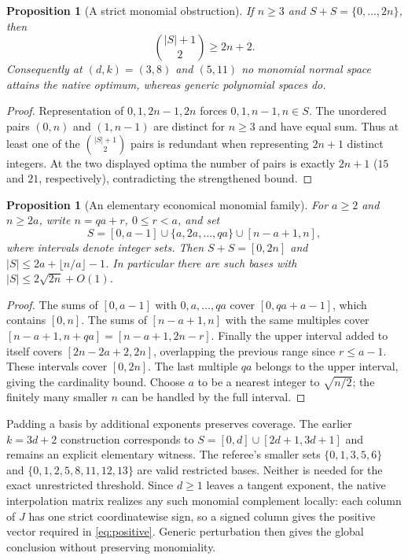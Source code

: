 \documentclass[11pt,reqno]{amsart}
\numberwithin{equation}{section}
\newtheorem{proposition}[theorem]{Proposition}
\theoremstyle{definition}\newtheorem{definition}[theorem]{Definition}
\theoremstyle{remark}\newtheorem{remark}[theorem]{Remark}
\begin{document}
\begin{proposition}[A strict monomial obstruction]\label{prop:monomial}
If $n\ge3$ and $S+S=\{0,\ldots,2n\}$, then
\[
 \binom{|S|+1}{2}\ge 2n+2.
\]
Consequently at $(d,k)=(3,8)$ and $(5,11)$ no monomial normal space attains the native optimum, whereas generic polynomial spaces do.
\end{proposition}
\begin{proof}
Representation of $0,1,2n-1,2n$ forces $0,1,n-1,n\in S$. The unordered pairs $(0,n)$ and $(1,n-1)$ are distinct for $n\ge3$ and have equal sum. Thus at least one of the $\binom{|S|+1}{2}$ pairs is redundant when representing $2n+1$ distinct integers. At the two displayed optima the number of pairs is exactly $2n+1$ ($15$ and $21$, respectively), contradicting the strengthened bound.
\end{proof}

\begin{proposition}[An elementary economical monomial family]\label{prop:basis}
For $a\ge2$ and $n\ge2a$, write $n=qa+r$, $0\le r<a$, and set
\[
 S=[0,a-1]\cup\{a,2a,\ldots,qa\}\cup[n-a+1,n],
\]
where intervals denote integer sets. Then $S+S=[0,2n]$ and
$|S|\le2a+\lfloor n/a\rfloor-1$. In particular there are such bases with $|S|\le2\sqrt{2n}+O(1)$.
\end{proposition}
\begin{proof}
The sums of $[0,a-1]$ with $0,a,\ldots,qa$ cover $[0,qa+a-1]$, which contains $[0,n]$. The sums of $[n-a+1,n]$ with the same multiples cover $[n-a+1,n+qa]=[n-a+1,2n-r]$. Finally the upper interval added to itself covers $[2n-2a+2,2n]$, overlapping the previous range since $r\le a-1$. These intervals cover $[0,2n]$. The last multiple $qa$ belongs to the upper interval, giving the cardinality bound. Choose $a$ to be a nearest integer to $\sqrt{n/2}$; the finitely many smaller $n$ can be handled by the full interval.
\end{proof}
Padding a basis by additional exponents preserves coverage. The earlier $k=3d+2$ construction corresponds to $S=[0,d]\cup[2d+1,3d+1]$ and remains an explicit elementary witness. The referee's smaller sets $\{0,1,3,5,6\}$ and $\{0,1,2,5,8,11,12,13\}$ are valid restricted bases. Neither is needed for the exact unrestricted threshold. Since $d\ge1$ leaves a tangent exponent, the native interpolation matrix realizes any such monomial complement locally: each column of $J$ has one strict coordinatewise sign, so a signed column gives the positive vector required in \eqref{eq:positive}. Generic perturbation then gives the global conclusion without preserving monomiality.
\end{document}

